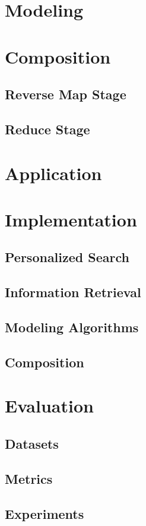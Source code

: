 \section{Modeling}



\section{Composition}      

\subsection{Reverse Map Stage}

\subsection{Reduce Stage}



\section{Application}



\section{Implementation}      

\subsection{Personalized Search}

\subsection{Information Retrieval}

\subsection{Modeling Algorithms}

\subsection{Composition}



\section{Evaluation}   

\subsection{Datasets}

\subsection{Metrics}

\subsection{Experiments}


